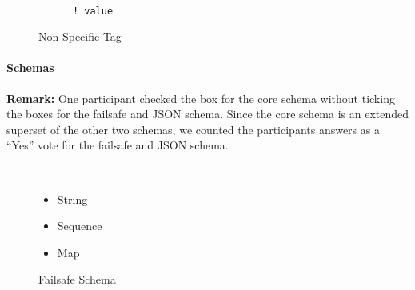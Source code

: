 \begin{figure}[H]
  \begin{minipage}[t]{0.48\textwidth}
    \vspace{0pt}
    \begin{bchart}[max=9, width=0.85\textwidth]
    \end{bchart}
  \end{minipage}
  \begin{minipage}[t]{0pt}~\end{minipage}
  \begin{minipage}[t]{0.48\textwidth}
    \vspace{0pt}
    \begin{verbatim}
      ! value
    \end{verbatim}
  \end{minipage}
  \caption{Non-Specific Tag}
\end{figure}

\paragraph{Schemas}

\textbf{Remark:} One participant checked the box for the core schema without ticking the boxes for the failsafe and JSON schema. Since the core schema is an extended superset of the other two schemas, we counted the participants answers as a “Yes” vote for the failsafe and JSON schema.

\begin{figure}[H]
  \begin{minipage}[t]{0.48\textwidth}
    \vspace{0pt}
    \begin{bchart}[max=9, width=0.85\textwidth]
      \bcxlabel{}
    \end{bchart}
  \end{minipage}
  \begin{minipage}[t]{0pt}~\end{minipage}
  \begin{minipage}[t]{0.48\textwidth}
    \begin{itemize}
      \item String
      \item Sequence
      \item Map
    \end{itemize}
  \end{minipage}
  \caption{Failsafe Schema}
\end{figure}

